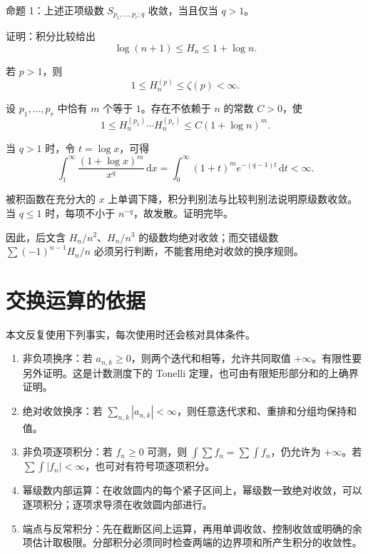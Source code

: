 \documentclass[11pt,a4paper]{article}
\providecommand{\tightlist}{\setlength{\itemsep}{3pt}\setlength{\parskip}{0pt}}
\newenvironment{statementblock}{\par\Needspace{9\baselineskip}\noindent}{\par\nopagebreak[4]}
\newenvironment{proofblock}{\par\Needspace{4\baselineskip}\noindent}{\par}
\begin{document}
\begin{statementblock}

命题 1：上述正项级数 \(S_{p_1,\ldots,p_r;q}\) 收敛，当且仅当 \(q>1\)。

\end{statementblock}

\begin{proofblock}

证明：积分比较给出
\[
\log(n+1)\leqslant H_n\leqslant1+\log n.
\]

若 \(p>1\)，则
\[
1\leqslant H_n^{(p)}\leqslant\zeta(p)<\infty.
\]

设 \(p_1,\ldots,p_r\) 中恰有 \(m\) 个等于 \(1\)。存在不依赖于 \(n\) 的常数 \(C>0\)，使
\[
1\leqslant H_n^{(p_1)}\cdots H_n^{(p_r)}
\leqslant C(1+\log n)^m.
\]

当 \(q>1\) 时，令 \(t=\log x\)，可得
\[
\int_1^\infty\frac{(1+\log x)^m}{x^q}\,\mathrm dx
=\int_0^\infty(1+t)^m e^{-(q-1)t}\,\mathrm dt<\infty.
\]

被积函数在充分大的 \(x\) 上单调下降，积分判别法与比较判别法说明原级数收敛。当 \(q\leqslant1\) 时，每项不小于 \(n^{-q}\)，故发散。证明完毕。

\end{proofblock}

因此，后文含 \(H_n/n^2\)、\(H_n/n^3\) 的级数均绝对收敛；而交错级数 \(\sum(-1)^{n-1}H_n/n\) 必须另行判断，不能套用绝对收敛的换序规则。

\hypertarget{sec-2}{%
\section{交换运算的依据}\label{sec-2}}

本文反复使用下列事实，每次使用时还会核对具体条件。

\begin{enumerate}
\def\labelenumi{\arabic{enumi}.}
\tightlist
\item
  非负项换序：若 \(a_{n,k}\geqslant0\)，则两个迭代和相等，允许共同取值 \(+\infty\)。有限性要另外证明。这是计数测度下的 Tonelli 定理，也可由有限矩形部分和的上确界证明。
\item
  绝对收敛换序：若 \(\sum_{n,k}|a_{n,k}|<\infty\)，则任意迭代求和、重排和分组均保持和值。
\item
  非负项逐项积分：若 \(f_n\geqslant0\) 可测，则 \(\int\sum f_n=\sum\int f_n\)，仍允许为 \(+\infty\)。若 \(\sum\int|f_n|<\infty\)，也可对有符号项逐项积分。
\item
  幂级数内部运算：在收敛圆内的每个紧子区间上，幂级数一致绝对收敛，可以逐项积分；逐项求导须在收敛圆内部进行。
\item
  端点与反常积分：先在截断区间上运算，再用单调收敛、控制收敛或明确的余项估计取极限。分部积分必须同时检查两端的边界项和所产生积分的收敛性。
\end{enumerate}
\end{document}

